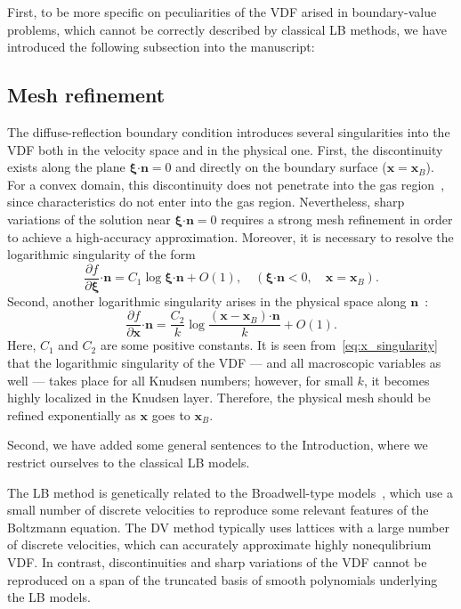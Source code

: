 \documentclass{article}
\newcommand{\pder}[2][]{\frac{\partial#1}{\partial#2}}
\newcommand{\OO}[1]{O(#1)}
\newcommand{\bxi}{\boldsymbol{\xi}}
\newcommand{\bn}{\boldsymbol{n}}
\newcommand{\bdot}{\boldsymbol{\cdot}}
\newcommand{\bx}{\boldsymbol{x}}
\begin{document}
First, to be more specific on peculiarities of the VDF arised in boundary-value problems,
which cannot be correctly described by classical LB methods,
we have introduced the following subsection into the manuscript:
\begin{leftbar}
    \subsection*{Mesh refinement}
    The diffuse-reflection boundary condition introduces several singularities into the VDF
    both in the velocity space and in the physical one.
    First, the discontinuity exists along the plane \(\bxi\bdot\bn=0\) and directly on the boundary surface (\(\bx=\bx_B\)).
    For a convex domain, this discontinuity does not penetrate into the gas region~\cite{Kim2011, Guo2017},
    since characteristics do not enter into the gas region.
    Nevertheless, sharp variations of the solution near \(\bxi\bdot\bn=0\) requires a strong mesh refinement
    in order to achieve a high-accuracy approximation.
    Moreover, it is necessary to resolve the logarithmic singularity of the form~\cite{Takata2016}
    \begin{equation}\label{eq:xi_singularity}
        \pder[f]{\bxi}\bdot\bn = C_1\log\bxi\bdot\bn + \OO{1}, \quad (\bxi\bdot\bn<0, \quad \bx=\bx_B).
    \end{equation}
    Second, another logarithmic singularity arises in the physical space along \(\bn\)~\cite{Takata2014}:
    \begin{equation}\label{eq:x_singularity}
        \pder[f]{\bx}\bdot\bn = \frac{C_2}{k}\log\frac{(\bx-\bx_B)\bdot\bn}{k} + \OO{1}.
    \end{equation}
    Here, \(C_1\) and \(C_2\) are some positive constants.
    It is seen from~\eqref{eq:x_singularity} that the logarithmic singularity of the VDF
    --- and all macroscopic variables as well --- takes place for all Knudsen numbers;
    however, for small \(k\), it becomes highly localized in the Knudsen layer.
    Therefore, the physical mesh should be refined exponentially as \(\bx\) goes to \(\bx_B\).
\end{leftbar}

Second, we have added some general sentences to the Introduction,
where we restrict ourselves to the classical LB models.
\begin{leftbar}
    The LB method is genetically related to the Broadwell-type models~\cite{Broadwell1964shock, Gatignol1975},
    which use a small number of discrete velocities to reproduce some relevant features of the Boltzmann equation.
    The DV method typically uses lattices with a large number of discrete velocities,
    which can accurately approximate highly nonequlibrium VDF.
    In contrast, discontinuities and sharp variations of the VDF cannot be reproduced
    on a span of the truncated basis of smooth polynomials underlying the LB models.
\end{leftbar}
\end{document}
